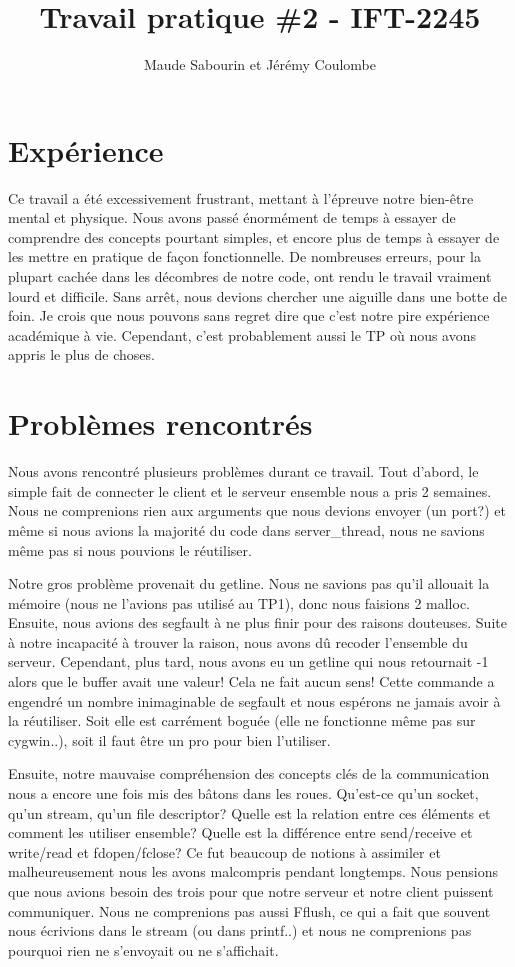 \documentclass[11pt]{article}
\title{Travail pratique \#2 - IFT-2245}
\author{Maude Sabourin et Jérémy Coulombe}
\begin{document}
\maketitle
\section{Expérience}
Ce travail a été excessivement frustrant, mettant à l’épreuve notre bien-être mental et physique. Nous avons passé énormément de temps à essayer de comprendre des concepts pourtant simples, et encore plus de temps à essayer de les mettre en pratique de façon fonctionnelle. De nombreuses erreurs, pour la plupart cachée dans les décombres de notre code, ont rendu le travail vraiment lourd et difficile. Sans arrêt, nous devions chercher une aiguille dans une botte de foin. Je crois que nous pouvons sans regret dire que c’est notre pire expérience académique à vie. Cependant, c’est probablement aussi le TP où nous avons appris le plus de choses.

\section{Problèmes rencontrés}
Nous avons rencontré plusieurs problèmes durant ce travail. Tout d’abord, le simple fait de connecter le client et le serveur ensemble nous a pris 2 semaines. Nous ne comprenions rien aux arguments que nous devions envoyer (un port?) et même si nous avions la majorité du code dans server\_thread, nous ne savions même pas si nous pouvions le réutiliser. 

Notre gros problème provenait du getline. Nous ne savions pas qu’il allouait la mémoire (nous ne l’avions pas utilisé au TP1), donc nous faisions 2 malloc. Ensuite, nous avions des segfault à ne plus finir pour des raisons douteuses. Suite à notre incapacité à trouver la raison, nous avons dû recoder l'ensemble du serveur. Cependant, plus tard, nous avons eu un getline qui nous retournait -1 alors que le buffer avait une valeur! Cela ne fait aucun sens! Cette commande a engendré un nombre inimaginable de segfault et nous espérons ne jamais avoir à la réutiliser. Soit elle est carrément boguée (elle ne fonctionne même pas sur cygwin..), soit il faut être un pro pour bien l’utiliser.

Ensuite, notre mauvaise compréhension des concepts clés de la communication nous a encore une fois mis des bâtons dans les roues. Qu’est-ce qu’un socket, qu’un stream, qu’un file descriptor? Quelle est la relation entre ces éléments et comment les utiliser ensemble? Quelle est la différence entre send/receive et write/read et fdopen/fclose? Ce fut beaucoup de notions à assimiler et malheureusement nous les avons malcompris pendant longtemps. Nous pensions que nous avions besoin des trois pour que notre serveur et notre client puissent communiquer. Nous ne comprenions pas aussi Fflush, ce qui a fait que souvent nous écrivions dans le stream (ou dans printf..) et nous ne comprenions pas pourquoi rien ne s’envoyait ou ne s’affichait.
\end{document}
